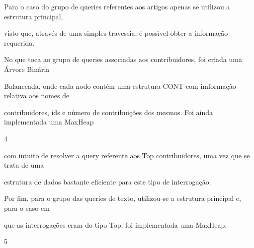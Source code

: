 \documentclass[a4paper,portrait,12pt]{article}
\begin{document}
\begin{flushleft}
Para o caso do grupo de queries referentes aos artigos apenas se utilizou a estrutura principal,
\end{flushleft}


\begin{flushleft}
visto que, através de uma simples travessia, é poss\i{}́vel obter a informação requerida.
\end{flushleft}


\begin{flushleft}
No que toca ao grupo de queries associadas aos contribuidores, foi criada uma Árvore Binária
\end{flushleft}


\begin{flushleft}
Balanceada, onde cada nodo contém uma estrutura CONT com imformação relativa aos nomes de
\end{flushleft}


\begin{flushleft}
contribuidores, ids e número de contribuições dos mesmos. Foi ainda implementada uma MaxHeap
\end{flushleft}





4





\begin{flushleft}
\newpage
com intuito de resolver a query referente aos Top contribuidores, uma vez que se trata de uma
\end{flushleft}


\begin{flushleft}
estrutura de dados bastante eficiente para este tipo de interrogação.
\end{flushleft}


\begin{flushleft}
Por fim, para o grupo das queries de texto, utilizou-se a estrutura principal e, para o caso em
\end{flushleft}


\begin{flushleft}
que as interrogações eram do tipo Top, foi implementada uma MaxHeap.
\end{flushleft}





5
\end{document}
